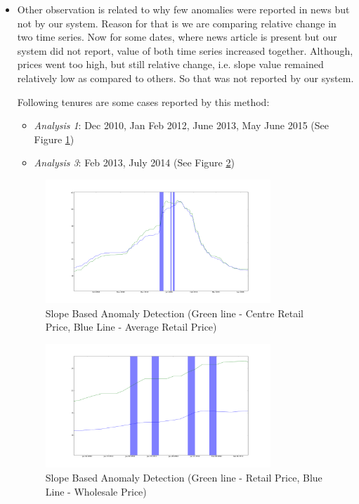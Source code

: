 \documentclass[a4paper,10pt]{report}
\begin{document}
\begin{itemize}
			
			
			
			
			\item Other observation is related to why few anomalies were reported in news but not by our system. Reason for that is we are comparing relative change in two time series. Now for some dates, where news article is present but our system did not report, value of both time series increased together. Although, prices went too high, but still relative change, i.e. slope value remained relatively low as compared to others. So that was not reported by our system.
				
			Following tenures are some cases reported by this method:
			\begin{itemize}
				\item \textit{Analysis 1}: Dec 2010, Jan Feb 2012, June 2013, May June 2015   (See Figure \ref{fig:12113})
				\item \textit{Analysis 3}: Feb 2013, July 2014   (See Figure \ref{fig:12133})
			\end{itemize}
			
			\begin{figure}[H]
		    	\centering
  		    	\includegraphics[width=0.8\textwidth]{graphs/12113.png}
		    	\caption{Slope Based Anomaly Detection (Green line - Centre Retail Price, Blue Line - Average Retail Price)}
		    	\label{fig:12113}
			\end{figure}
			
			\begin{figure}[H]
		    	\centering
  		    	\includegraphics[width=0.8\textwidth]{graphs/12133.png}
		    	\caption{Slope Based Anomaly Detection (Green line - Retail Price, Blue Line - Wholesale Price)}
		    	\label{fig:12133}
			\end{figure}
			

\end{itemize}
\end{document}
